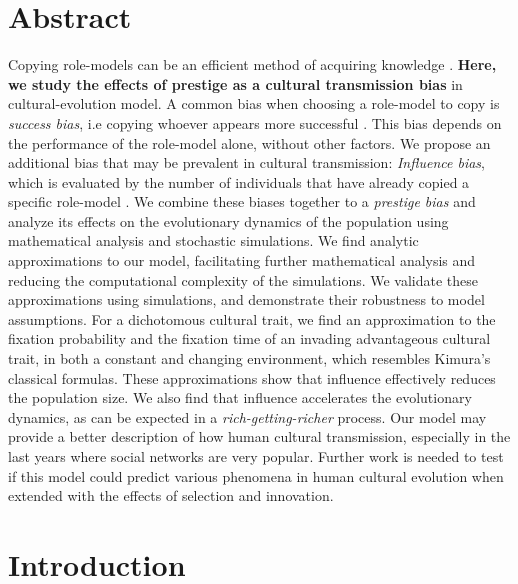\documentclass[11pt]{article}
\begin{document}
\section{Abstract}
Copying role-models can be an efficient method of acquiring knowledge \citep{strategiesPaper}. \textbf{Here, we study the effects of prestige as a cultural transmission bias} in cultural-evolution model. A common bias when choosing a role-model to copy is \textit{success bias}, i.e copying whoever appears more successful \citep{evolution_of_cultural_evolution}. This bias depends on the performance of the role-model alone, without other factors. We propose an additional bias that may be prevalent in cultural transmission: \textit{Influence bias}, which is evaluated by the number of individuals that have already copied a specific role-model \citep{prestige_evolution}. We combine these biases together to a \textit{prestige bias} and analyze its effects on the evolutionary dynamics of the population using mathematical analysis and stochastic simulations. We find analytic approximations to our model, facilitating further mathematical analysis and reducing the computational complexity of the simulations. We validate these approximations using simulations, and demonstrate their robustness to model assumptions.
For a dichotomous cultural trait, we find  an approximation to the fixation probability and the fixation time of an invading advantageous cultural trait, in both a constant and changing environment, which resembles Kimura's classical formulas.
These approximations show that influence effectively reduces the population size. %
We also find that influence accelerates the evolutionary dynamics, as can be expected in a \textit{rich-getting-richer} process.
Our model may provide a better description of how human cultural transmission, 
especially in the last years where social networks are very popular. %
Further work is needed to test if this model could predict various phenomena in human cultural evolution when extended with the effects of selection and innovation.

\section{Introduction}
\end{document}
